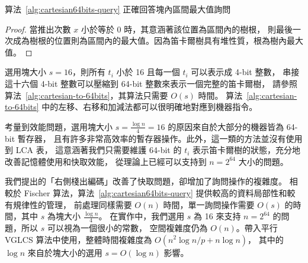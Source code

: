 \begin{theorem} \label{thm:correctness}
  算法~\ref{alg:cartesian64bits-query} 正確回答塊內區間最大值詢問
\end{theorem}
\begin{proof}
當推出次數 $x$ 小於等於 0 時，其意涵著該位置為區間內的樹根，
則最後一次成為樹根的位置則為區間內的最大值。因為笛卡爾樹具有堆性質，根為樹內最大值。
\end{proof}

選用塊大小 $s=16$，則所有 $t_i$ 小於 16 且每一個 $t_i$ 可以表示成 4-bit 整數，
串接這十六個 4-bit 整數可以壓縮到 64-bit 整數來表示一個完整的笛卡爾樹，
請參照算法~\ref{alg:cartesian-to-64bits}，其算法只需要 $O(s)$ 時間。
算法~\ref{alg:cartesian-to-64bits} 中的左移、右移和加減法都可以很明確地對應到機器指令。



考量到效能問題，選用塊大小 $s = \frac{\log n}{4} = 16$ 的原因來自於大部分的機器皆為 64-bit 暫存器，
且有許多非常高效率的暫存器操作。此外，這一類的方法並沒有使用到 LCA 表，
這意涵著我們只需要維護 64-bit 的 $t_i$ 表示笛卡爾樹的狀態，充分地改善記憶體使用和快取效能，
從理論上已經可以支持到 $n = 2^{64}$ 大小的問題。

我們提出的「右側棧出編碼」改善了快取問題，卻增加了詢問操作的複雜度。
相較於 Fischer 算法，算法~\ref{alg:cartesian64bits-query} 提供較高的資料局部性和較有規律性的管理，
前處理同樣需要 $O(n)$ 時間，單一詢問操作需要 $O(s)$ 的時間，其中 $s$ 為塊大小 $\frac{\log n}{4}$。
在實作中，我們選用 $s$ 為 16 來支持 $n = 2^{64}$ 的問題，所以 $s$ 可以視為一個很小的常數，
空間複雜度仍為 $O(n)$。帶入平行 VGLCS 算法中使用，整體時間複雜度為 $O(n^2 \log{n} / p + n \log n)$，
其中的 $\log n$ 來自於塊大小的選用 $s = O(\log n)$ 影響。
